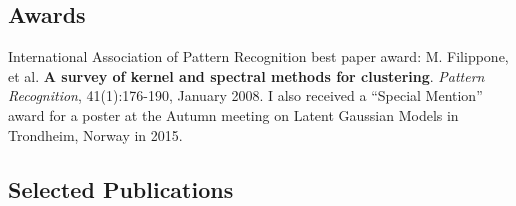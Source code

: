 \documentclass[oneside, a4paper, onecolumn, 10pt]{article}
\begin{document}


\subsection*{Awards}
International Association of Pattern Recognition best paper award: 
       M. Filippone, et al. %
       \textbf{A survey of kernel and spectral methods for clustering}.
       \emph{Pattern Recognition}, 41(1):176-190, January 2008.
%
I also received a ``Special Mention'' award for a poster at the Autumn meeting on Latent Gaussian Models in Trondheim, Norway in 2015. 


\subsection*{Selected Publications}
\end{document}
